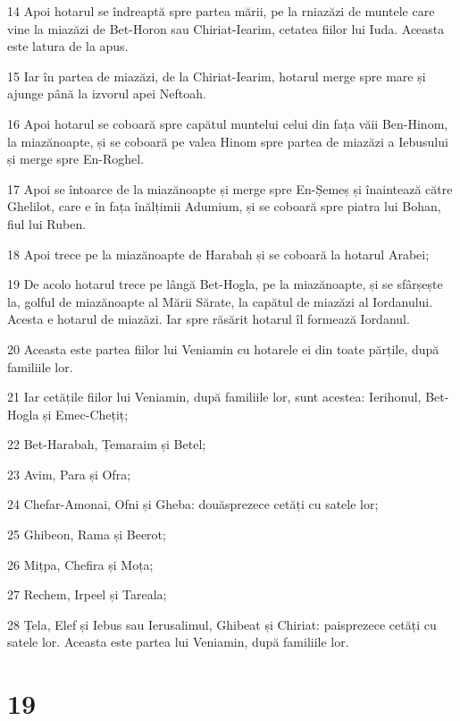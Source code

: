 \par 14 Apoi hotarul se îndreaptă spre partea mării, pe la rniazăzi de muntele care vine la miazăzi de Bet-Horon sau Chiriat-Iearim, cetatea fiilor lui Iuda. Aceasta este latura de la apus.
\par 15 Iar în partea de miazăzi, de la Chiriat-Iearim, hotarul merge spre mare și ajunge până la izvorul apei Neftoah.
\par 16 Apoi hotarul se coboară spre capătul muntelui celui din fața văii Ben-Hinom, la miazănoapte, și se coboară pe valea Hinom spre partea de miazăzi a Iebusului și merge spre En-Roghel.
\par 17 Apoi se întoarce de la miazănoapte și merge spre En-Șemeș și înaintează către Ghelilot, care e în fața înălțimii Adumium, și se coboară spre piatra lui Bohan, fiul lui Ruben.
\par 18 Apoi trece pe la miazănoapte de Harabah și se coboară la hotarul Arabei;
\par 19 De acolo hotarul trece pe lângă Bet-Hogla, pe la miazănoapte, și se sfârșește la, golful de miazănoapte al Mării Sărate, la capătul de miazăzi al Iordanului. Acesta e hotarul de miazăzi. Iar spre răsărit hotarul îl formează Iordanul.
\par 20 Aceasta este partea fiilor lui Veniamin cu hotarele ei din toate părțile, după familiile lor.
\par 21 Iar cetățile fiilor lui Veniamin, după familiile lor, sunt acestea: Ierihonul, Bet-Hogla și Emec-Chețiț;
\par 22 Bet-Harabah, Țemaraim și Betel;
\par 23 Avim, Para și Ofra;
\par 24 Chefar-Amonai, Ofni și Gheba: douăsprezece cetăți cu satele lor;
\par 25 Ghibeon, Rama și Beerot;
\par 26 Mițpa, Chefira și Moța;
\par 27 Rechem, Irpeel și Tareala;
\par 28 Țela, Elef și Iebus sau Ierusalimul, Ghibeat și Chiriat: paisprezece cetăți cu satele lor. Aceasta este partea lui Veniamin, după familiile lor.

\chapter{19}


